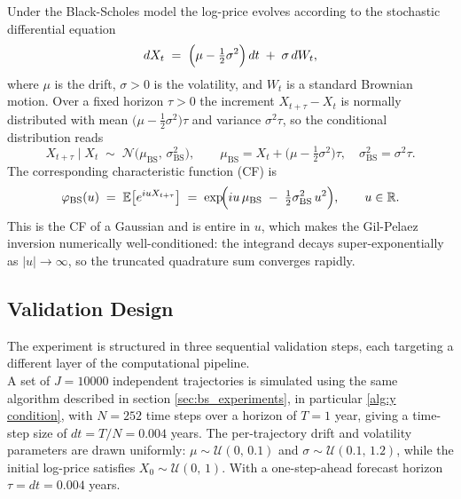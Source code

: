 Under the Black-Scholes model the log-price evolves according to the
stochastic differential equation
\begin{equation}
    dX_t \;=\; \Bigl(\mu - \tfrac{1}{2}\sigma^2\Bigr)\,dt \;+\; \sigma\,dW_t,
    \label{eq:bs_sde}
\end{equation}
where $\mu$ is the drift, $\sigma > 0$ is the volatility, and $W_t$ is a
standard Brownian motion.  Over a fixed horizon $\tau > 0$ the increment
$X_{t+\tau} - X_t$ is normally distributed with mean
$\bigl(\mu - \tfrac{1}{2}\sigma^2\bigr)\tau$ and variance $\sigma^2\tau$,
so the conditional distribution reads
\begin{equation}
    X_{t+\tau} \mid X_t \;\sim\;
    \mathcal{N}\!\bigl(\mu_{\mathrm{BS}},\,\sigma_{\mathrm{BS}}^2\bigr),
    \qquad
    \mu_{\mathrm{BS}} = X_t + \bigl(\mu - \tfrac{1}{2}\sigma^2\bigr)\tau,
    \quad
    \sigma_{\mathrm{BS}}^2 = \sigma^2\tau.
    \label{eq:bs_normal}
\end{equation}
The corresponding characteristic function (CF) is
\begin{equation}
    \varphi_{\mathrm{BS}}(u)
    \;=\;
    \mathbb{E}\bigl[e^{iuX_{t+\tau}}\bigr]
    \;=\;
    \exp\!\Bigl(iu\,\mu_{\mathrm{BS}} \;-\; \tfrac{1}{2}\sigma_{\mathrm{BS}}^2\,u^2\Bigr),
    \qquad u \in \mathbb{R}.
    \label{eq:bs_cf}
\end{equation}
This is the CF of a Gaussian and is entire in $u$, which makes the
Gil-Pelaez inversion numerically well-conditioned: the integrand decays
super-exponentially as $|u| \to \infty$, so the truncated quadrature sum
converges rapidly.

\subsection{Validation Design}
\label{subsec:validation_design}

The experiment is structured in three sequential validation steps, each
targeting a different layer of the computational pipeline.\\


A set of $J = 10000$ independent trajectories is simulated using the 
same algorithm described in section \ref{sec:bs_experiments}, in particular \ref{alg:y condition}, with $N = 252$ time steps over a horizon of
$T = 1$ year, giving a time-step size of $dt = T/N = 0.004$ years.  The
per-trajectory drift and volatility parameters are drawn uniformly:
$\mu \sim \mathcal{U}(0,\, 0.1)$ and $\sigma \sim \mathcal{U}(0.1,\, 1.2)$,
while the initial log-price satisfies $X_0 \sim \mathcal{U}(0,\, 1)$.  With
a one-step-ahead forecast horizon $\tau = dt = 0.004$ years.\\

